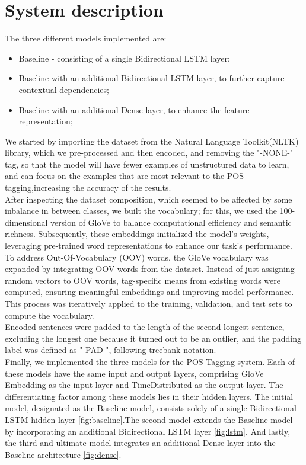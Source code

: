 \documentclass[11pt]{article}
\begin{document}
\section{System description}
\label{sec:system}
The three different models implemented are:
\begin{itemize}
    \item Baseline - consisting of a single Bidirectional LSTM layer;
    \item Baseline with an additional Bidirectional LSTM layer,  to further capture contextual dependencies;
    \item Baseline with an additional Dense layer, to enhance the feature representation;
\end{itemize}
We started by importing the dataset from the Natural Language Toolkit(NLTK) library, which we pre-processed and then encoded, and removing the "-NONE-" tag, so that the model will have fewer examples of unstructured data to learn, and can focus on the examples that are most relevant to the POS tagging,increasing the accuracy of the results.
\\After inspecting the dataset composition, which seemed to be affected by some inbalance in between classes, we built the vocabulary; for this, we used the 100-dimensional version of GloVe to balance computational efficiency and semantic richness. Subsequently, these embeddings initialized the model's weights, leveraging pre-trained word representations to enhance our task's performance.
\\To address Out-Of-Vocabulary (OOV) words, the GloVe vocabulary was expanded by integrating OOV words from the dataset. Instead of just assigning random vectors to OOV words, tag-specific means from existing words were computed, ensuring meaningful embeddings and improving model performance. This process was iteratively applied to the training, validation, and test sets to compute the vocabulary.
\\Encoded sentences were padded to the length of the second-longest sentence, excluding the longest one because it turned out to be an outlier, and the padding label was defined as "-PAD-", following treebank notation.
\\Finally, we implemented the three models for the POS Tagging system. Each of these models have the same input and output layers, comprising GloVe Embedding as the input layer and TimeDistributed as the output layer. The differentiating factor among these models lies in their hidden layers.
The initial model, designated as the Baseline model, consists solely of a single Bidirectional LSTM hidden layer \ref{fig:baseline}.The second model extends the Baseline model by incorporating an additional Bidirectional LSTM layer \ref{fig:lstm}. And lastly, the third and ultimate model integrates an additional Dense layer into the Baseline architecture \ref{fig:dense}.
\end{document}
